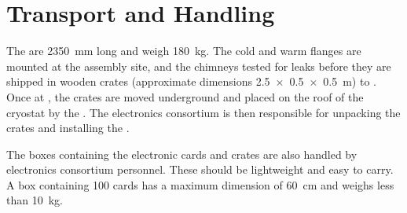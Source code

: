 \section{Transport and Handling}
\label{sec:dp-tpcelec-transport}

The  are \SI{2350}{\mm} long and weigh \SI{180}{\kg}.  The cold and warm flanges are mounted at the assembly site, and the chimneys tested for leaks before they are shipped in wooden crates (approximate dimensions \SI[product-units=power]{2.5x0.5x0.5}{m}) to . Once at , the crates are moved underground and placed on the roof of the cryostat by the . The  electronics consortium is then responsible for unpacking the crates and installing the . 

The boxes containing the electronic cards and  crates are also handled by  electronics consortium personnel. These should be lightweight and easy to carry. A box containing \num{100}  cards has a maximum dimension of \SI{60}{\cm} and weighs less than \SI{10}{\kg}. 

